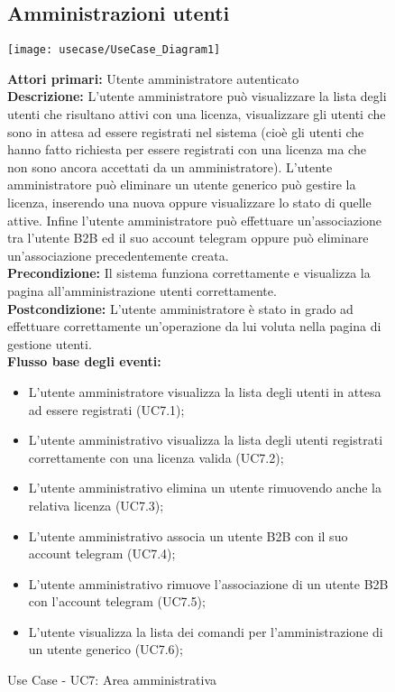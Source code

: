 \begin{figure}[h!]
\subsection{Amministrazioni utenti}
   \begin{center}
    \texttt{[image: usecase/UseCase\_Diagram1]} 
    \caption{Use Case - UC7: Area amministrativa}
    \end{center}
    
    \textbf{Attori primari:}   Utente amministratore autenticato\\
    
\textbf{Descrizione:} L'utente amministratore può visualizzare la lista degli utenti che risultano attivi con una licenza, visualizzare gli utenti che sono in attesa ad essere registrati nel sistema (cioè gli utenti che hanno fatto richiesta per essere registrati con una licenza ma che non sono ancora accettati da un amministratore). L'utente amministratore può eliminare un utente generico può gestire la licenza, inserendo una nuova oppure visualizzare lo stato di quelle attive. Infine l'utente amministratore può effettuare un'associazione tra l'utente B2B ed il suo account telegram oppure può eliminare un'associazione precedentemente creata. \\

\textbf{Precondizione:}   Il sistema funziona correttamente e visualizza la pagina all'amministrazione utenti correttamente. \\

\textbf{Postcondizione:}  L'utente amministratore è stato in grado ad effettuare correttamente  un'operazione da lui voluta nella pagina di gestione utenti.\\


\textbf{Flusso base degli eventi:} 

\begin{itemize}

\item L'utente amministratore visualizza la lista degli utenti in attesa ad essere registrati (UC7.1);
\item L'utente amministrativo visualizza la lista degli utenti registrati correttamente con una licenza valida (UC7.2);
\item L'utente amministrativo elimina un utente rimuovendo anche la relativa licenza (UC7.3);
\item L'utente amministrativo associa un utente B2B con il suo account telegram (UC7.4);
\item L'utente amministrativo rimuove l'associazione di un utente B2B con l'account telegram (UC7.5);
\item L'utente visualizza la lista dei comandi per l'amministrazione di un utente generico (UC7.6);
\end{itemize}  

\end{figure}






